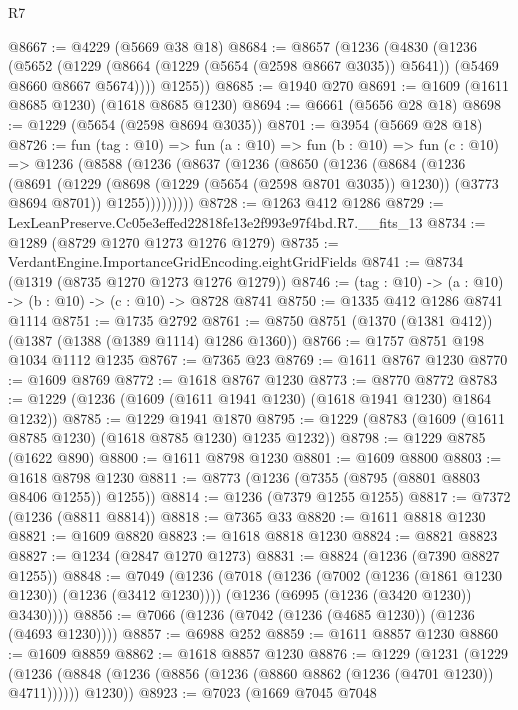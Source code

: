 \begin{lexlean}{R7}
\begin{coremodule}
@8667 := @4229 (@5669 @38 @18)
@8684 := @8657
    (@1236
      (@4830
        (@1236
          (@5652
            (@1229 (@8664 (@1229 (@5654 (@2598 @8667 @3035)) @5641)) (@5469 @8660 @8667 @5674))))
        @1255))
@8685 := @1940 @270
@8691 := @1609 (@1611 @8685 @1230) (@1618 @8685 @1230)
@8694 := @6661 (@5656 @28 @18)
@8698 := @1229 (@5654 (@2598 @8694 @3035))
@8701 := @3954 (@5669 @28 @18)
@8726 := fun (tag : @10) =>
  fun (a : @10) =>
  fun (b : @10) =>
  fun (c : @10) =>
  @1236
    (@8588
      (@1236
        (@8637
          (@1236
            (@8650
              (@1236
                (@8684
                  (@1236
                    (@8691
                      (@1229 (@8698 (@1229 (@5654 (@2598 @8701 @3035)) @1230)) (@3773 @8694 @8701))
                      @1255)))))))))
@8728 := @1263 @412 @1286
@8729 := LexLeanPreserve.Cc05e3effed22818fe13e2f993e97f4bd.R7.__fits_13
@8734 := @1289 (@8729 @1270 @1273 @1276 @1279)
@8735 := VerdantEngine.ImportanceGridEncoding.eightGridFields
@8741 := @8734 (@1319 (@8735 @1270 @1273 @1276 @1279))
@8746 := (tag : @10) -> (a : @10) -> (b : @10) -> (c : @10) -> @8728 @8741
@8750 := @1335 @412 @1286 @8741 @1114
@8751 := @1735 @2792
@8761 := @8750 @8751 (@1370 (@1381 @412)) (@1387 (@1388 (@1389 @1114) @1286 @1360))
@8766 := @1757 @8751 @198 @1034 @1112 @1235
@8767 := @7365 @23
@8769 := @1611 @8767 @1230
@8770 := @1609 @8769
@8772 := @1618 @8767 @1230
@8773 := @8770 @8772
@8783 := @1229 (@1236 (@1609 (@1611 @1941 @1230) (@1618 @1941 @1230) @1864 @1232))
@8785 := @1229 @1941 @1870
@8795 := @1229 (@8783 (@1609 (@1611 @8785 @1230) (@1618 @8785 @1230) @1235 @1232))
@8798 := @1229 @8785 (@1622 @890)
@8800 := @1611 @8798 @1230
@8801 := @1609 @8800
@8803 := @1618 @8798 @1230
@8811 := @8773 (@1236 (@7355 (@8795 (@8801 @8803 @8406 @1255)) @1255))
@8814 := @1236 (@7379 @1255 @1255)
@8817 := @7372 (@1236 (@8811 @8814))
@8818 := @7365 @33
@8820 := @1611 @8818 @1230
@8821 := @1609 @8820
@8823 := @1618 @8818 @1230
@8824 := @8821 @8823
@8827 := @1234 (@2847 @1270 @1273)
@8831 := @8824 (@1236 (@7390 @8827 @1255))
@8848 := @7049
    (@1236
      (@7018
        (@1236 (@7002 (@1236 (@1861 @1230 @1230)) (@1236 (@3412 @1230))))
        (@1236 (@6995 (@1236 (@3420 @1230)) @3430))))
@8856 := @7066 (@1236 (@7042 (@1236 (@4685 @1230)) (@1236 (@4693 @1230))))
@8857 := @6988 @252
@8859 := @1611 @8857 @1230
@8860 := @1609 @8859
@8862 := @1618 @8857 @1230
@8876 := @1229
    (@1231
      (@1229
        (@1236 (@8848 (@1236 (@8856 (@1236 (@8860 @8862 (@1236 (@4701 @1230)) @4711))))))
        @1230))
@8923 := @7023
    (@1669
      @7045
      @7048

\end{coremodule}
\end{lexlean}
